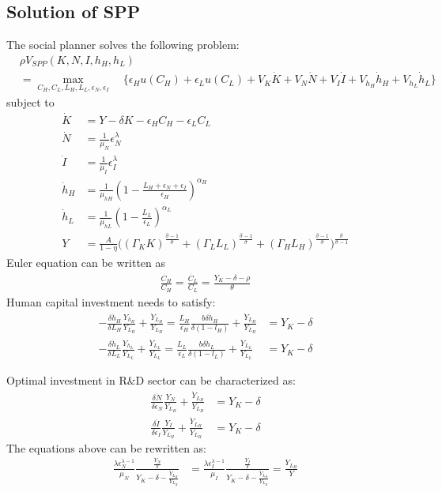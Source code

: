 \documentclass[12pt]{article}
\begin{document}
\subsection{Solution of SPP}
The social planner solves the following problem:
\begin{align*}
&\rho V_{SPP}(K,N,I,h_H,h_L)  \\
&= \max_{C_H, C_L,L_H,L_L,\epsilon_N, \epsilon_I} \quad \{\epsilon_H u(C_H)+\epsilon_L u(C_L)+V_K\dot{K}+V_N\dot{N}+V_I\dot{I}+V_{h_H}\dot{h}_H+V_{h_L}\dot{h}_L\}
\end{align*}
subject to
\begin{align*}
\dot{K} &= Y-\delta K-\epsilon_H C_H-\epsilon_L C_L \\
\dot{N} &= \frac{1}{\mu_N}\epsilon_N^{\lambda} \\
\dot{I} &= \frac{1}{\mu_I}\epsilon_I^{\lambda} \\
\dot{h}_H &= \frac{1}{\mu_{hH}} (1-\frac{L_H+\epsilon_N+\epsilon_I}{\epsilon_H})^{\alpha_H} \\
\dot{h}_L &= \frac{1}{\mu_{hL}} (1-\frac{L_L}{\epsilon_L})^{\alpha_L} \\
Y &= \frac{A}{1-\eta}\Big((\Gamma_KK)^{\frac{\hat{\sigma}-1}{\hat{\sigma}}}+(\Gamma_LL_L)^{\frac{\hat{\sigma}-1}{\hat{\sigma}}}+(\Gamma_HL_H)^{\frac{\hat{\sigma}-1}{\hat{\sigma}}}\Big)^{\frac{\hat{\sigma}}{\hat{\sigma}-1}}
\end{align*}
Euler equation can be written as 
\begin{align*}
\frac{\dot{C_H}}{C_H} = \frac{\dot{C_L}}{C_L} = \frac{Y_K-\delta-\rho}{\theta}
\end{align*}
Human capital investment needs to satisfy: 
\begin{align*}
-\frac{\delta \dot{h}_H}{\delta L_H}\frac{Y_{h_H}}{Y_{L_H}}+\frac{\dot{Y}_{L_H}}{Y_{L_H}} = \frac{L_H}{\epsilon_H}\frac{b \delta \dot{h}_H}{\delta(1-l_H)}+\frac{\dot{Y}_{L_H}}{Y_{L_H}} &= Y_K-\delta \\
-\frac{\delta \dot{h}_L}{\delta L_L}\frac{Y_{h_L}}{Y_{L_L}}+\frac{\dot{Y}_{L_L}}{Y_{L_L}} = \frac{L_L}{\epsilon_L}\frac{b \delta \dot{h}_L}{\delta(1-l_L)}+\frac{\dot{Y}_{L_L}}{Y_{L_L}} &= Y_K-\delta 
\end{align*}

Optimal investment in R\&D sector can be characterized as:
\begin{align*}
\frac{\delta \dot{N}}{\delta \epsilon_N}\frac{Y_N}{Y_{L_H}}+\frac{\dot{Y}_{L_H}}{Y_{L_H}} &= Y_K-\delta \\
\frac{\delta \dot{I}}{\delta \epsilon_I}\frac{Y_I}{Y_{L_H}}+\frac{\dot{Y}_{L_H}}{Y_{L_H}} &= Y_K-\delta  
\end{align*}
The equations above can be rewritten as: 
\begin{align*}
\frac{\lambda\epsilon_N^{\lambda-1}}{\mu_N}\frac{\frac{Y_N}{Y}}{Y_K-\delta-\frac{\dot{Y}_{L_H}}{Y_{L_H}}} &= \frac{\lambda\epsilon_I^{\lambda-1}}{\mu_I}\frac{\frac{Y_I}{Y}}{Y_K-\delta-\frac{\dot{Y}_{L_H}}{Y_{L_H}}} = \frac{Y_{L_H}}{Y} \\
\end{align*}
\end{document}

